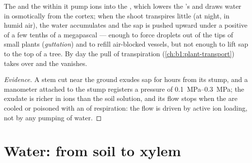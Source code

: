 \begin{proposition}\label{prop:b1:plant-water-minerals:rootpressure}
The  and the  within it pump ions into the , which
lowers the 's  and draws water in osmotically from
the cortex; when the shoot transpires little (at night, in humid air),
the water accumulates and the  sap is pushed upward under a
positive \emph{} of a few tenths of a megapascal ---
enough to force droplets out of the  tips of small plants
(\emph{guttation}) and to refill air-blocked vessels, but not enough
to lift sap to the top of a tree. By day the pull of transpiration
(\cref{ch:b1:plant-transport}) takes over and the 
vanishes.
\end{proposition}
\begin{proof}[Evidence]
A stem cut near the ground exudes sap for hours from its stump, and
a manometer attached to the stump registers a pressure of
\qtyrange{0.1}{0.3}{MPa}; the exudate is richer in ions than the soil
solution, and its flow stops when the  are cooled or poisoned
with an  of respiration: the flow is driven by active ion
loading, not by any pumping of water.
\end{proof}

\section{Water: from soil to xylem}

